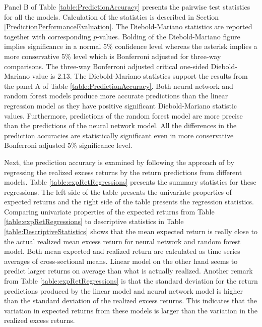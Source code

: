 \documentclass[12pt]{article}
\begin{document}
Panel B of Table \ref{table:PredictionAccuracy} presents the pairwise \citet{Diebold1995} test statistics for all the models. Calculation of the statistics is described in Section \ref{PredictionPerformanceEvaluation}. The Diebold-Mariano statistics are reported together with corresponding $p$-values. Bolding of the Diebold-Mariano figure implies significance in a normal 5\% confidence level whereas the asterisk implies a more conservative 5\% level which is Bonferroni adjusted for three-way comparisons. The three-way Bonferroni adjusted critical one-sided Diebold-Mariano value is 2.13. The Diebold-Mariano statistics support the results from the panel A of Table \ref{table:PredictionAccuracy}. Both neural network and random forest models produce more accurate predictions than the linear regression model as they have positive significant Diebold-Mariano statistic values. Furthermore, predictions of the random forest model are more precise than the predictions of the neural network model. All the differences in the prediction accuracies are statistically significant even in more conservative Bonferroni adjusted 5\% significance level. \par

Next, the prediction accuracy is examined by following the approach of \citet{Lewellen2015} by regressing the realized excess returns by the return predictions from different models. Table \ref{table:expRetRegressions} presents the summary statistics for these regressions. The left side of the table presents the univariate properties of expected returns and the right side of the table presents the regression statistics. Comparing univariate properties of the expected returns from Table \ref{table:expRetRegressions} to descriptive statistics in Table \ref{table:DescriptiveStatistics} shows that the mean expected return is really close to the actual realized mean excess return for neural network and random forest model. Both mean expected and realized return are calculated as time series averages of cross-sectional means. Linear model on the other hand seems to predict larger returns on average than what is actually realized. Another remark from Table \ref{table:expRetRegressions} is that the standard deviation for the return predictions produced by the linear model and neural network model is higher than the standard deviation of the realized excess returns. This indicates that the variation in expected returns from these models is larger than the variation in the realized excess returns. \par
\end{document}
